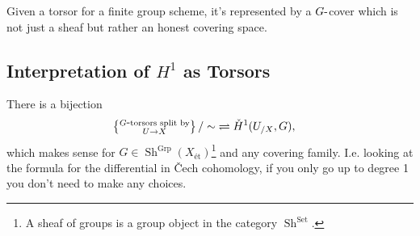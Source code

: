 \begin{remark}

Given a torsor for a finite group scheme, it's represented by a
\(G{\hbox{-}}\)cover which is not just a sheaf but rather an honest
covering space.

\end{remark}

\hypertarget{interpretation-of-h1-as-torsors}{%
\subsection{\texorpdfstring{Interpretation of \(H^1\) as
Torsors}{Interpretation of H\^{}1 as Torsors}}\label{interpretation-of-h1-as-torsors}}

\begin{proposition}[Interpretation of $H^1$]

There is a bijection
\begin{align*}  
\left\{{\substack{G{\hbox{-}}\text{torsors split by} \\ U\to X}}\right\} / \sim
&\rightleftharpoons
{\check{H}}^1(U_{/X}, G)
,\end{align*}
which makes sense for
\(G\in {\operatorname{Sh}}^{\operatorname{Grp}}(X_\text{ét})\)\footnote{A
  sheaf of groups is a group object in the category
  \({\operatorname{Sh}}^{\operatorname{Set}}\).} and any covering
family. I.e. looking at the formula for the differential in Čech
cohomology, if you only go up to degree 1 you don't need to make any
choices.

\end{proposition}

